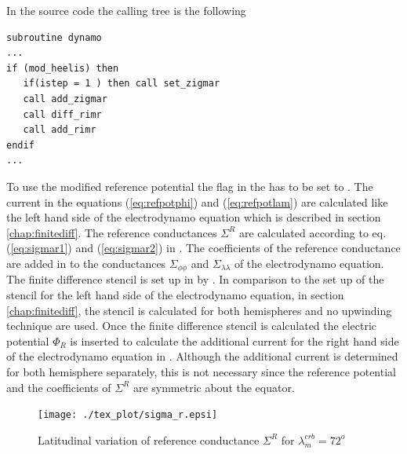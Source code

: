 In the source code the calling tree is the
following
%
\begin{verbatim}
subroutine dynamo
...
if (mod_heelis) then
   if(istep = 1 ) then call set_zigmar
   call add_zigmar
   call diff_rimr
   call add_rimr
endif
...
\end{verbatim}
%
To use the modified reference potential the flag 
 in the   has to be set to . 
The current in the equations (\ref{eq:refpotphi}) and (\ref{eq:refpotlam})
are calculated like the left hand side of the electrodynamo equation 
which is described in section
\ref{chap:finitediff}. The reference conductances 
$\Sigma^R$ are calculated according to eq. (\ref{eq:sigmar1}) and 
(\ref{eq:sigmar2}) in . 
The coefficients of the reference conductance are added 
in  to the conductances 
$\Sigma_{\phi \phi}$ and $\Sigma_{\lambda \lambda}$ of the electrodynamo equation.
The finite difference stencil is set up in
 by
. In comparison to the set up of the stencil for 
the left hand side of the electrodynamo equation, in section
\ref{chap:finitediff}, the stencil is calculated for both hemispheres and no
upwinding technique are used. Once the finite difference stencil is 
calculated the electric
potential $\Phi_R$ is inserted to calculate the additional 
current for the right hand side of the electrodynamo equation
in . Although the additional current
is determined  for both hemisphere separately,
this is not necessary since the reference  potential and the coefficients 
of $\Sigma^R$
are symmetric about the equator.
%
%
\begin{figure}
  \centering
  \texttt{[image: ./tex\_plot/sigma\_r.epsi]}
  \caption{Latitudinal variation of reference conductance 
    $\Sigma^R$ for  $\lambda_m^{crb}= 72^o$  }
   \label{fig:sigma_r}
\end{figure}
%
%
